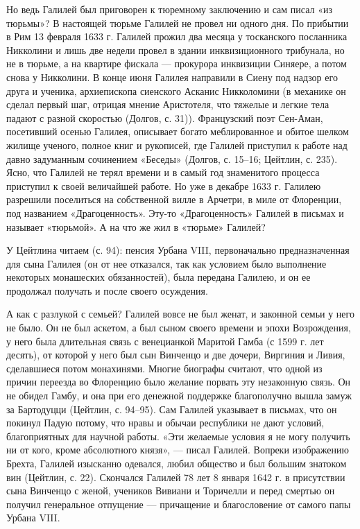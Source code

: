Но ведь Галилей был приговорен к  тюремному заключению и сам писал «из
тюрьмы»?  В настоящей  тюрьме  Галилей  не провел  ни  одного дня.  По
прибытии  в  Рим 13  февраля  1633  г.  Галилей  прожил два  месяца  у
тосканского посланника  Никколини и  лишь две  недели провел  в здании
инквизиционного трибунала, но  не в тюрьме, а на  квартире фискала ---
прокурора инквизиции Синяере, а потом  снова у Никколини. В конце июня
Галилея направили в Сиену под надзор его друга и ученика, архиепископа
сиенского  Асканис  Никколомини  (в  механике он  сделал  первый  шаг,
отрицая мнение Аристотеля,  что тяжелые и легкие тела  падают с разной
скоростью  (Долгов, с.  31)).  Французский  поэт Сен-Аман,  посетивший
осенью Галилея, описывает богато  меблированное и обитое шелком жилище
ученого, полное книг  и рукописей, где Галилей приступил  к работе над
давно задуманным  сочинением «Беседы» (Долгов, с.  15--16; Цейтлин, с.
235). Ясно,  что Галилей не  терял времени  и в самый  год знаменитого
процесса приступил к своей величайшей работе. Но уже в декабре 1633 г.
Галилею разрешили  поселиться на собственной  вилле в Арчетри,  в миле
от  Флоренции, под  названием «Драгоценность».  Эту-то «Драгоценность»
Галилей в  письмах и называет  «тюрьмой». А на  что же жил  в «тюрьме»
Галилей?

У  Цейтлина   читаем  (с.  94):  пенсия   Урбана  VIII,  первоначально
предназначенная  для  сына  Галилея  (он от  нее  отказался,  так  как
условием  было  выполнение  некоторых монашеских  обязанностей),  была
передана Галилею, и он ее продолжал получать и после своего осуждения.

А как  с разлукой  с семьей?  Галилей вовсе не  был женат,  и законной
семьи у него не было. Он не  был аскетом, а был сыном своего времени и
эпохи Возрождения, у него была  длительная связь с венецианкой Маритой
Гамба (с  1599 г. лет  десять), от которой у  него был сын  Винченцо и
две  дочери, Виргиния  и Ливия,  сделавшиеся потом  монахинями. Многие
биографы  считают, что  одной  из причин  переезда  во Флоренцию  было
желание  порвать эту  незаконную  связь.  Он не  обидел  Гамбу, и  она
при  его денежной  поддержке  благополучно вышла  замуж за  Бартодуцци
(Цейтлин,  с.  94--95).  Сам  Галилей  указывает  в  письмах,  что  он
покинул Падую потому,  что нравы и обычаи республики  не дают условий,
благоприятных  для научной  работы. «Эти  желаемые условия  я не  могу
получить  ни от  кого, кроме  абсолютного князя»,  --- писал  Галилей.
Вопреки изображению Брехта, Галилей изысканно одевался, любил общество
и был большим знатоком вин (Цейтлин,  с. 22). Скончался Галилей 78 лет
8 января 1642 г. в присутствии сына Винченцо с женой, учеников Вивиани
и  Торичелли и  перед  смертью он  получил  генеральное отпущение  ---
причащение и благословение от самого папы Урбана VIII.

